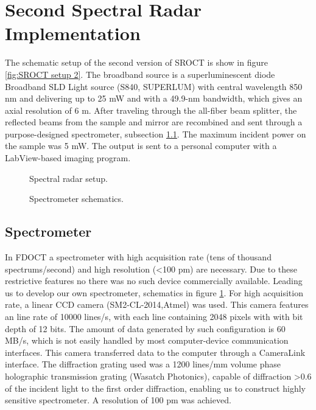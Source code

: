 \documentclass[12pt,twoside,english]{book}
\renewcommand{\~}{\perispomeni}%
\numberwithin{equation}{section}
\numberwithin{figure}{section}
\begin{document}
\section{Second Spectral Radar Implementation}
The schematic setup of the second version of SROCT is show in figure \ref{fig:SROCT setup 2}.  The broadband source is a superluminescent diode Broadband SLD Light source (S840, SUPERLUM) with central wavelength 850 nm and delivering up to 25 mW and with a 49.9-nm bandwidth, which gives an axial resolution of 6 m. After traveling through the all-fiber beam splitter, the reflected beams from the sample and mirror are recombined and sent through a purpose-designed spectrometer, subsection \ref{sub:spectrometer}. The maximum incident power on the sample was 5 mW. The output is sent to a personal computer with a LabView-based imaging program. 
\begin{figure}[h]
\small
\begin{minipage}[t]{0.48\textwidth}

\caption{Spectral radar setup.}
\label{fig:SROCT setup 2}
\end{minipage}
\hfill
\begin{minipage}[t]{0.48\textwidth}

\caption{Spectrometer schematics.}
\label{fig:spectrometer}
\end{minipage}
\end{figure}

\subsection{Spectrometer}
\label{sub:spectrometer}
In FDOCT a spectrometer with high acquisition rate (tens of thousand spectrums/second) and high resolution (<100 pm) are necessary. Due to these restrictive features no there was no such device commercially available. Leading us to develop our own spectrometer, schematics in figure \ref{fig:spectrometer}. For high acquisition rate, a linear CCD camera (SM2-CL-2014,Atmel) was used. This camera features an line rate of 10000 lines/s, with each line containing 2048 pixels with with bit depth of 12 bits. The amount of data generated by such configuration is 60 MB/s, which is not easily handled by most computer-device communication interfaces. This camera transferred data to the computer through a CameraLink interface. The diffraction grating used was a 1200 lines/mm volume phase holographic transmission grating (Wasatch Photonics), capable of diffraction >0.6 of the incident light to the first order diffraction, enabling us to construct highly sensitive spectrometer. A resolution of 100 pm was achieved.
\pagebreak
\end{document}
